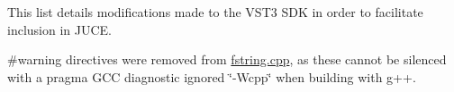 This list details modifications made to the VST3 SDK in order to facilitate inclusion in JUCE.


\begin{DoxyItemize}
\item {\ttfamily \#warning} directives were removed from \mbox{\hyperlink{fstring_8cpp}{fstring.\+cpp}}, as these cannot be silenced with a {\ttfamily pragma GCC diagnostic ignored \char`\"{}-\/\+Wcpp\char`\"{}} when building with g++. 
\end{DoxyItemize}